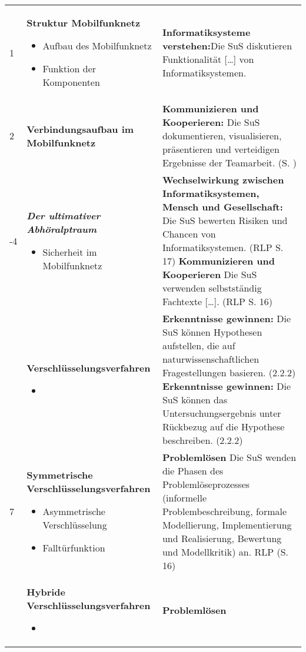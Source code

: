 \begin{longtable}{lp{5cm}X}
1 & \textbf{Struktur Mobilfunknetz} 
	\begin{itemize}
		\item Aufbau des Mobilfunknetz
		\item Funktion der Komponenten
	\end{itemize} & 
	\textbf{Informatiksysteme verstehen:}Die SuS diskutieren Funktionalität […] von Informatiksystemen.
	 \\ %
2 & \textbf{Verbindungsaufbau im Mobilfunknetz} 
	 & 
	\textbf{Kommunizieren und Kooperieren:} Die SuS dokumentieren, visualisieren, präsentieren und verteidigen Ergebnisse der Teamarbeit. (S. )
	 \\ \addlinespace[.5em]	 
3-4 & \textbf{\textit{Der ultimativer Abhör\-alpt\-raum}} 
	\begin{itemize}
		\item Sicherheit im Mobilfunknetz
	\end{itemize} & 
	\textbf{Wechselwirkung zwischen Informatiksystemen, Mensch und Gesellschaft:} Die SuS bewerten Risiken und Chancen von Informatiksystemen. (RLP S. 17) \newline
	\textbf{Kommunizieren und Kooperieren} Die SuS verwenden selbstständig Fachtexte […]. (RLP S. 16)
	\\ \addlinespace[.5em]
6 & \textbf{Verschlüsselungsverfahren} 
	\begin{itemize}
		\item 
	\end{itemize} &  
	\textbf{Erkenntnisse gewinnen:} Die SuS können Hypothesen aufstellen, die auf naturwissenschaftlichen Fragestellungen basieren. (2.2.2)\newline
	\textbf{Erkenntnisse gewinnen:} Die SuS können das Untersuchungsergebnis unter Rückbezug auf die Hypothese beschreiben. (2.2.2)
	\\ \addlinespace[.5em]	
\rowcolor{lightgray}
7 & \textbf{Symmetrische Verschlüsselungsverfahren} 
	\begin{itemize}
		\item Asymmetrische Verschlüsselung
		\item Falltürfunktion
	\end{itemize} &  
	\textbf{Problemlösen} Die SuS wenden die Phasen des Problemlöseprozesses (informelle Problembeschreibung, formale Modellierung, Implementierung und Realisierung, Bewertung und Modellkritik) an. RLP (S. 16)
	\\ \addlinespace[.5em]
8 & \textbf{Hybride Verschlüsselungsverfahren} 
	\begin{itemize}
		\item 
	\end{itemize} &  
	\textbf{Problemlösen}\\ %
\end{longtable}
